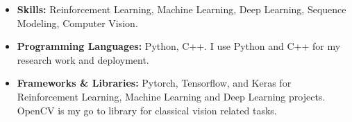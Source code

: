 \documentclass[11pt,a4paper,sans]{moderncv}        %
\begin{document}
\begin{itemize}
\setlength\itemsep{0em}
\item \textbf{Skills:} Reinforcement Learning, Machine Learning, Deep Learning, Sequence Modeling, Computer Vision.


\item \textbf{Programming Languages:} Python, C++. I use Python and C++ for my research work and deployment.

\item \textbf{Frameworks \& Libraries:} Pytorch, Tensorflow, and Keras for Reinforcement Learning, Machine Learning and Deep Learning projects. OpenCV is my go to library for classical vision related tasks.







\end{itemize}
\end{document}
